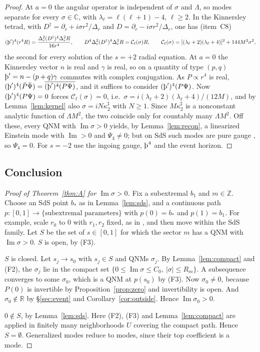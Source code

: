\documentclass[11pt]{amsart}
\theoremstyle{definition}
\theoremstyle{remark}
\numberwithin{equation}{section}
\newcommand{\Th}{\text{\th}}
\newcommand{\R}{\mathbb{R}}
\newcommand{\C}{\mathbb{C}}
\newcommand{\Z}{\mathbb{Z}}
\renewcommand{\Im}{\operatorname{Im}}
\begin{document}
\begin{proof}
At $a=0$ the angular operator is independent of $\sigma$ and $\Lambda$, so modes separate for every $\sigma\in\C$, with
$\lambda_\ell=\ell(\ell+1)-4$, $\ell\ge2$. In the Kinnersley tetrad, with $D^\dagger=\partial_r+i\sigma r^2/\Delta_r$ and
$D=\partial_r-i\sigma r^2/\Delta_r$, one has (item~C8)
\begin{equation}\label{eq:sdsTS}
(\Th')^4(r^4R)=\frac{\Delta_r^2(D^\dagger)^4\Delta_r^2R}{16r^4},\qquad D^4\Delta_r^2(D^\dagger)^4\Delta_r^2R=\mathcal C_\ell(\sigma)R,
\qquad\mathcal C_\ell(\sigma)=[(\lambda_\ell+2)(\lambda_\ell+4)]^2+144M^2\sigma^2,
\end{equation}
the second for every solution of the $s=+2$ radial equation. At $a=0$ the Kinnersley vector $n$ is real and $\gamma$ is real, so on a quantity of type $(p,q)$
$\Th'=n-(p+q)\gamma$ commutes with complex conjugation. As $P\propto r^4$ is real,
$(\Th')^4(\bar P\bar\Psi)=\overline{(\Th')^4(P\Psi)}$, and it suffices to consider $(\Th')^4(P\Psi)$. Now $(\Th')^4(P\Psi)=0$ forces
$\mathcal C_\ell(\sigma)=0$, i.e.\ $\sigma=i(\lambda_\ell+2)(\lambda_\ell+4)/(12M)$, and by Lemma~\ref{lem:kernel} also
$\sigma=iN\kappa_2^\sharp$ with $N\ge1$. Since $M\kappa_2^\sharp$ is a nonconstant analytic function of $\Lambda M^2$, the two
coincide only for countably many $\Lambda M^2$. Off these, every QNM with $\Im\sigma>0$ yields, by Lemma~\ref{lem:recon},
a linearized Einstein mode with $\Im>0$ and $\Psi_4\ne0$; but on SdS such modes are pure gauge \cite[\S7]{HV18}, so
$\Psi_4=0$. For $s=-2$ use the ingoing gauge, $\Th^4$ and the event horizon.
\end{proof}

\subsection{Conclusion}
\begin{proof}[Proof of Theorem~\ref{thm:A} for $\Im\sigma>0$]
Fix a subextremal $b_1$ and $m\in\Z$. Choose an SdS point $b_*$ as in Lemma~\ref{lem:sds}, and a continuous path
$p:[0,1]\to\{\text{subextremal parameters}\}$ with $p(0)=b_*$ and $p(1)=b_1$. For example, scale $r_0$ to $0$ with
$r_1,r_2$ fixed, as in \cite[\S6]{Hin26}, and then move within the SdS family. Let $S$ be the set of $s\in[0,1]$ for
which the sector $m$ has a QNM with $\Im\sigma>0$.
$S$ is open, by (F3).

$S$ is closed. Let $s_j\to s_0$ with $s_j\in S$ and QNMs $\sigma_j$. By Lemma~\ref{lem:compact} and (F2), the
$\sigma_j$ lie in the compact set $\{0\le\Im\sigma\le C_0,\ |\sigma|\le R_m\}$. A subsequence converges to some
$\sigma_0$, which is a QNM at $p(s_0)$ by (F3). Now $\sigma_0\ne0$, because $P(0)$ is invertible by
Proposition~\ref{prop:zero} and invertibility is open. And $\sigma_0\notin\R$ by \S\ref{sec:event} and
Corollary~\ref{cor:outside}. Hence $\Im\sigma_0>0$.

$0\notin S$, by Lemma~\ref{lem:sds}.
Here (F2), (F3) and Lemma~\ref{lem:compact} are applied in finitely many neighborhoods $U$ covering the compact path. Hence $S=\emptyset$. Generalized modes reduce to modes, since their top coefficient is a mode.
\end{proof}
\end{document}
